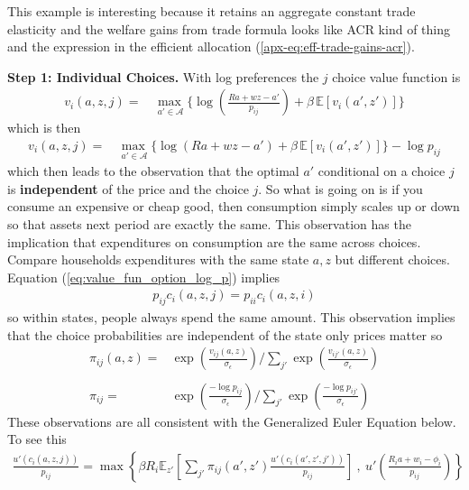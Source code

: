 \documentclass[12pt,pdftex]{article}
\begin{document}
\begin{onehalfspacing}
This example is interesting because it retains an aggregate constant trade elasticity and the welfare gains from trade formula looks like ACR kind of thing and the expression in the efficient allocation (\ref{apx-eq:eff-trade-gains-acr}).

\textbf{Step 1: Individual Choices.} With log preferences the $j$ choice value function is
\begin{align}
v_{i}(a, z, j) = &  \max_{\ a' \in \mathcal{A} }\bigg  \{ \log\left (\frac{Ra + wz - a'}{p_{ij}} \right )  + \beta \, \mathbb{E} [v_{i}(a', z')]  \bigg\}
\end{align}
which is then
\begin{align}
v_{i}(a, z, j) = &  \max_{\ a' \in \mathcal{A} }\bigg  \{ \log(Ra + wz - a' )  + \beta \, \mathbb{E} [v_{i}(a', z' )]  \bigg\} - \log p_{ij}
\label{eq:value_fun_option_log_p}
\end{align}
which then leads to the observation that the optimal $a'$ conditional on a choice $j$ is \textbf{independent} of the price and the choice $j$. So what is going on is if you consume an expensive or cheap good, then consumption simply scales up or down so that assets next period are exactly the same. This observation has the implication that expenditures on consumption are the same across choices. Compare households expenditures with the same state $a,z$ but different choices. Equation (\ref{eq:value_fun_option_log_p}) implies
\begin{align}
p_{ij}c_{i}(a,z,j) = p_{ii}c_{i}(a,z,i)
\label{eq:apx-same-spending}
\end{align}
so within states, people always spend the same amount. This observation implies that the choice probabilities are independent of the state only prices matter so
\begin{align}
\pi_{ij}(a, z) = & \exp \left( \frac{ v_{ij}(a, z) }{\sigma_{\epsilon}} \right) \Bigg / \sum_{j'} \exp \left( \frac{ v_{ij'}(a, z ) }{\sigma_{\epsilon}} \right) \\
\nonumber\\
\pi_{ij} = & \exp \left( \frac{  -\log p_{ij} }{\sigma_{\epsilon}} \right) \Bigg / \sum_{j'} \exp \left( \frac{ -\log p_{ij'} }{\sigma_{\epsilon}} \right) \label{apx-eq:shares}
\end{align}
These observations are all consistent with the Generalized Euler Equation below. To see this
\begin{align}
\frac{u'(c_{i}(a, z, j))}{p_{ij}} = \max \left\{ \beta R_{i} \mathbb{E}_{z'} \left[ \sum_{j'} \pi_{ij}(a', z') \frac{u'(c_{i}(a', z', j'))}{p_{ij}} \right] \ , \  u' \left( \frac{R_i a + w_i - \phi_{i}}{p_{ij}} \right) \right \}

\end{align}
\end{onehalfspacing}
\end{document}
